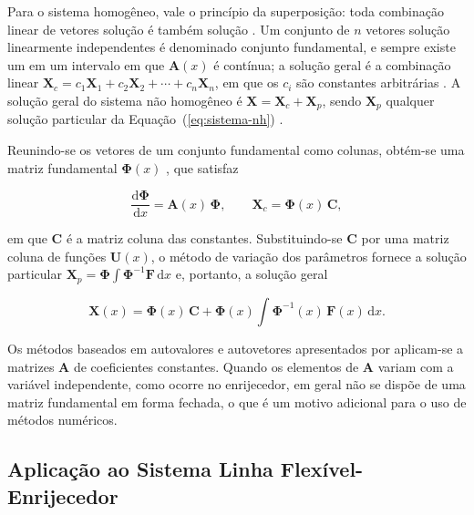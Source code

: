 \documentclass[arial,centeredequations,english,brazilian,oneside,section=TITLE]{ifes8}
\begin{document}
Para o sistema homogêneo, vale o princípio da superposição: toda combinação linear de
vetores solução é também solução \cite{Zill2001v2}. Um conjunto de $n$ vetores
solução linearmente independentes é denominado conjunto fundamental, e sempre existe um
em um intervalo em que $\mathbf{A}(x)$ é contínua; a solução geral é a combinação linear
$\mathbf{X}_c = c_1\mathbf{X}_1 + c_2\mathbf{X}_2 + \cdots + c_n\mathbf{X}_n$, em que os
$c_i$ são constantes arbitrárias \cite{Zill2001v2}. A solução geral do sistema
não homogêneo é $\mathbf{X} = \mathbf{X}_c + \mathbf{X}_p$, sendo $\mathbf{X}_p$ qualquer
solução particular da Equação~(\ref{eq:sistema-nh}) \cite{Zill2001v2}.
 
Reunindo-se os vetores de um conjunto fundamental como colunas, obtém-se uma matriz
fundamental $\boldsymbol{\Phi}(x)$ \cite{Zill2001v2}, que satisfaz

\begin{equation}
  \label{eq:matriz-fundamental}
  \frac{\mathrm{d}\boldsymbol{\Phi}}{\mathrm{d}x} = \mathbf{A}(x)\,\boldsymbol{\Phi},
  \qquad \mathbf{X}_c = \boldsymbol{\Phi}(x)\,\mathbf{C},
\end{equation}

em que $\mathbf{C}$ é a matriz coluna das constantes. Substituindo-se $\mathbf{C}$ por
uma matriz coluna de funções $\mathbf{U}(x)$, o método de variação dos parâmetros fornece
a solução particular $\mathbf{X}_p = \boldsymbol{\Phi}\int \boldsymbol{\Phi}^{-1}
\mathbf{F}\,\mathrm{d}x$ e, portanto, a solução geral \cite{Zill2001v2}

\begin{equation}
  \label{eq:var-parametros}
  \mathbf{X}(x) = \boldsymbol{\Phi}(x)\,\mathbf{C}
  + \boldsymbol{\Phi}(x) \int \boldsymbol{\Phi}^{-1}(x)\,\mathbf{F}(x)\,\mathrm{d}x.
\end{equation}

Os métodos baseados em autovalores e autovetores apresentados por
 aplicam-se a matrizes $\mathbf{A}$ de coeficientes
constantes. Quando os elementos de $\mathbf{A}$ variam com a variável independente, como
ocorre no enrijecedor, em geral não se dispõe de uma matriz fundamental em forma
fechada, o que é um motivo adicional para o uso de métodos numéricos.
 
\subsection{Aplicação ao Sistema Linha Flexível-Enrijecedor}
\label{sub:edo-enrijecedor}
 
\end{document}
